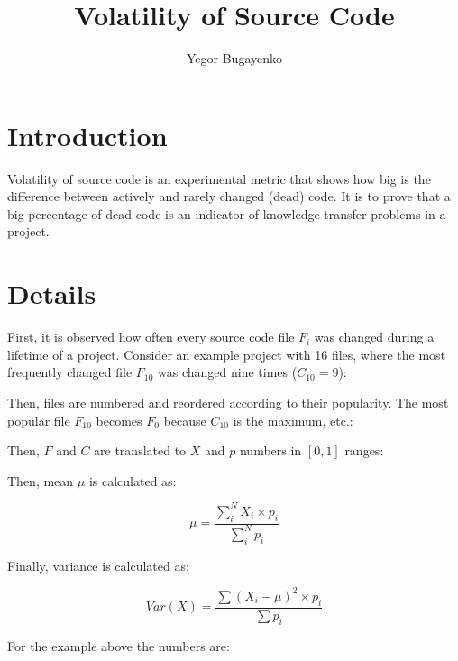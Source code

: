 \documentclass[12pt]{article}
\begin{document}
    \setlength{\parindent}{0pt}
    \setlength{\parskip}{1em}

\title{Volatility of Source Code}
\author{Yegor Bugayenko}
\maketitle

\section{Introduction}

    Volatility of source code is an experimental metric that
    shows how big is the difference between actively and rarely changed (dead)
    code. It is to prove that a big percentage of dead code is
    an indicator of knowledge transfer problems in a project.

\section{Details}

    First, it is observed how often every source code file $F_i$ was changed
    during a lifetime of a project. Consider an example project with 16 files,
    where the most frequently changed file $F_{10}$ was changed nine times
    ($C_{10} = 9$):

    \immediate{}
    

    Then, files are numbered and reordered according to their popularity.
    The most popular file $F_{10}$ becomes $F_0$ because $C_{10}$ is
    the maximum, etc.:

    \immediate{}
    

    Then, $F$ and $C$ are translated to $X$ and $p$ numbers in $[0, 1]$ ranges:

    \immediate{}
    

    Then, mean $\mu$ is calculated as:

        $$\mu = \frac{\displaystyle\sum\limits^N_i {X_i \times p_i}}{\displaystyle\sum\limits^N_i p_i}$$

    Finally, variance is calculated as:

        $$Var(X) = \frac{\displaystyle\sum\limits {(X_i - \mu)^2 \times p_i}}{\displaystyle\sum\limits p_i}$$

    For the example above the numbers are:
\end{document}
